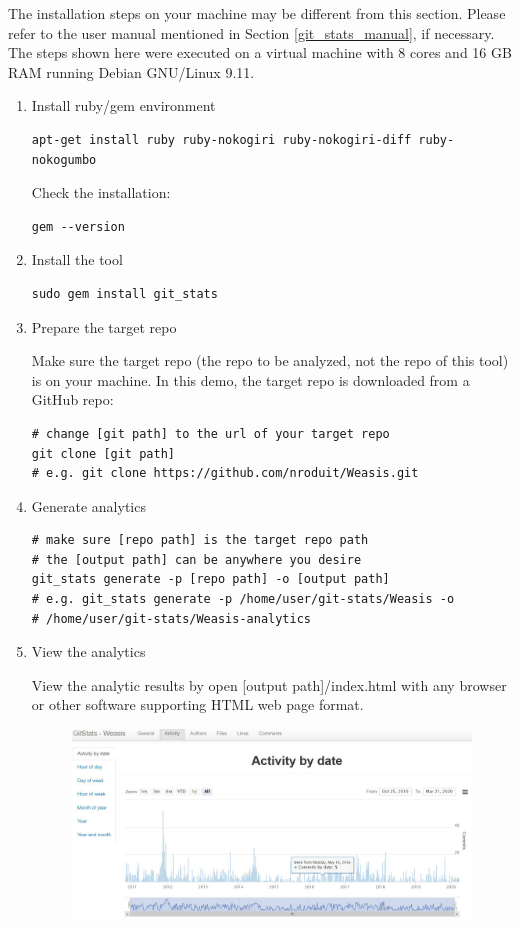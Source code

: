 \documentclass[letterpaper,cleveref]{lipics-v2019}
\begin{document}
The installation steps on your machine may be different from this section.
Please refer to the user manual mentioned in Section \ref{git_stats_manual}, if
necessary.  The steps shown here were executed on a virtual machine with 8 cores
and 16 GB RAM running Debian GNU/Linux 9.11.

\begin{enumerate}
\item Install ruby/gem environment
\begin{lstlisting}
apt-get install ruby ruby-nokogiri ruby-nokogiri-diff ruby-nokogumbo
\end{lstlisting}

Check the installation:
\begin{lstlisting}
gem --version
\end{lstlisting}
    
\item Install the tool
\begin{lstlisting}
sudo gem install git_stats
\end{lstlisting}
    
\item Prepare the target repo

Make sure the target repo (the repo to be analyzed, not the repo of this tool)
is on your machine.
In this demo, the target repo is downloaded from a GitHub repo:
\begin{lstlisting}
# change [git path] to the url of your target repo
git clone [git path]
# e.g. git clone https://github.com/nroduit/Weasis.git
\end{lstlisting}
    
\item Generate analytics
\begin{lstlisting}
# make sure [repo path] is the target repo path
# the [output path] can be anywhere you desire
git_stats generate -p [repo path] -o [output path]
# e.g. git_stats generate -p /home/user/git-stats/Weasis -o 
# /home/user/git-stats/Weasis-analytics
\end{lstlisting}
    
\item View the analytics

View the analytic results by open [output path]/index.html with any browser or
other software supporting HTML web page format.

\begin{figure}[!ht]
\includegraphics[scale=0.4]{git-stats-demo.JPG}
\end{figure}


\end{enumerate}
\end{document}
